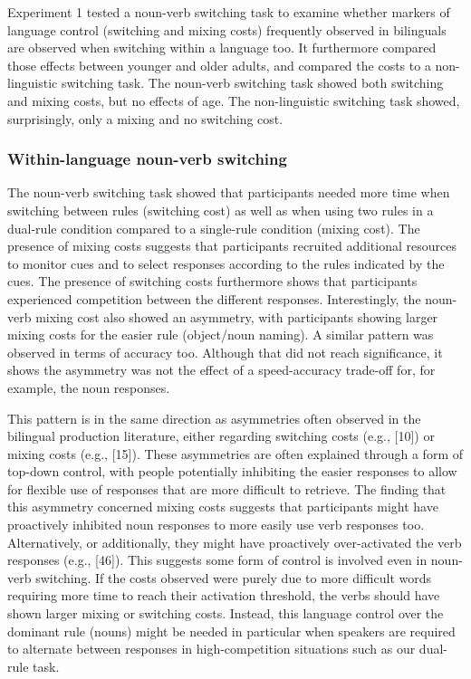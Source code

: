 \documentclass[
]{article}
\begin{document}
Experiment 1 tested a noun-verb switching task to examine whether markers of language control (switching and mixing costs) frequently observed in bilinguals are observed when switching within a language too. It furthermore compared those effects between younger and older adults, and compared the costs to a non-linguistic switching task. The noun-verb switching task showed both switching and mixing costs, but no effects of age. The non-linguistic switching task showed, surprisingly, only a mixing and no switching cost.

\hypertarget{within-language-noun-verb-switching}{%
\subsubsection{Within-language noun-verb switching}\label{within-language-noun-verb-switching}}

The noun-verb switching task showed that participants needed more time when switching between rules (switching cost) as well as when using two rules in a dual-rule condition compared to a single-rule condition (mixing cost). The presence of mixing costs suggests that participants recruited additional resources to monitor cues and to select responses according to the rules indicated by the cues. The presence of switching costs furthermore shows that participants experienced competition between the different responses. Interestingly, the noun-verb mixing cost also showed an asymmetry, with participants showing larger mixing costs for the easier rule (object/noun naming). A similar pattern was observed in terms of accuracy too. Although that did not reach significance, it shows the asymmetry was not the effect of a speed-accuracy trade-off for, for example, the noun responses.

This pattern is in the same direction as asymmetries often observed in the bilingual production literature, either regarding switching costs (e.g., {[}10{]}) or mixing costs (e.g., {[}15{]}). These asymmetries are often explained through a form of top-down control, with people potentially inhibiting the easier responses to allow for flexible use of responses that are more difficult to retrieve. The finding that this asymmetry concerned mixing costs suggests that participants might have proactively inhibited noun responses to more easily use verb responses too. Alternatively, or additionally, they might have proactively over-activated the verb responses (e.g., {[}46{]}). This suggests some form of control is involved even in noun-verb switching. If the costs observed were purely due to more difficult words requiring more time to reach their activation threshold, the verbs should have shown larger mixing or switching costs. Instead, this language control over the dominant rule (nouns) might be needed in particular when speakers are required to alternate between responses in high-competition situations such as our dual-rule task.
\end{document}
